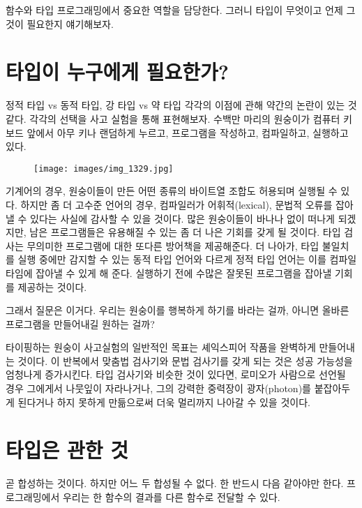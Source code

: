 
함수와 타입 \trCategory\는  프로그래밍에서 중요한 역할을 담당한다. 그러니 타입이 무엇이고 언제 그것이 필요한지 얘기해보자.

\section{타입이 누구에게 필요한가?}

정적 타입 vs 동적 타입, 강 타입 vs 약 타입 각각의 이점에 관해 약간의 논란이 있는 것 같다.
각각의 선택을 사고 실험을 통해 표현해보자. 수백만 마리의 원숭이가 컴퓨터 키보드 앞에서 아무 키나 랜덤하게 누르고, 프로그램을 작성하고, 컴파일하고, 실행하고 있다.

\begin{figure}[H]
\centering
\texttt{[image: images/img\_1329.jpg]}
\end{figure}

\noindent
기계어의 경우, 원숭이들이 만든 어떤 종류의 바이트열 조합도 허용되며 실행될 수 있다.
하지만 좀 더 고수준 언어의 경우, 컴파일러가 어휘적(lexical), 문법적 오류를 잡아낼 수 있다는 사실에 감사할 수 있을 것이다.
많은 원숭이들이 바나나 없이 떠나게 되겠지만, 남은 프로그램들은 유용해질 수 있는 좀 더 나은 기회를 갖게 될 것이다.
타입 검사는 무의미한 프로그램에 대한 또다른 방어책을 제공해준다.
더 나아가, 타입 불일치를 실행 중에만 감지할 수 있는 동적 타입 언어와 다르게 정적 타입 언어는 이를 컴파일 타임에 잡아낼 수 있게 해 준다.
실행하기 전에 수많은 잘못된 프로그램을 잡아낼 기회를 제공하는 것이다.

그래서 질문은 이거다. 우리는 원숭이를 행복하게 하기를 바라는 걸까, 아니면 올바른 프로그램을 만들어내길 원하는 걸까?

타이핑하는 원숭이 사고실험의 일반적인 목표는 셰익스피어 작품을 완벽하게 만들어내는 것이다.
이 반복에서 맞춤법 검사기와 문법 검사기를 갖게 되는 것은 성공 가능성을 엄청나게 증가시킨다.
타입 검사기와 비슷한 것이 있다면, 로미오가 사람으로 선언될 경우 그에게서 나뭇잎이 자라나거나, 그의 강력한 중력장이 광자(photon)를 붙잡아두게 된다거나 하지 못하게 만듦으로써 더욱 멀리까지 나아갈 수 있을 것이다.

\section{타입은  관한 것}

 곧 \trArrow\를 합성하는 것이다. 하지만 어느 두  합성될 수 없다. 
한  \trTargetObject\는 반드시 다음  \trSourceObject\와 같아야만 한다.
프로그래밍에서 우리는 한 함수의 결과를 다른 함수로 전달할 수 있다.

